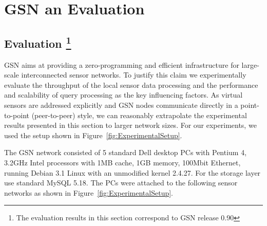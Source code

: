 \graphicspath{{chapters/ch-gsn/figures/}}

\chapter{GSN an Evaluation}%



\section{Evaluation \footnote{The evaluation results in this section correspond to GSN release 0.90}}
\label{sec:evaluation}

GSN aims at providing a zero-programming and efficient infrastructure for
large-scale interconnected sensor networks. To justify this claim we
experimentally evaluate the throughput of the local sensor data processing and
the performance and scalability of query processing as the key influencing
factors.  As virtual sensors are addressed explicitly and GSN nodes communicate
directly in a point-to-point (peer-to-peer) style, we can reasonably
extrapolate the experimental results presented in this section to larger
network sizes.  For our experiments, we used the setup shown in
Figure~\ref{fig:ExperimentalSetup}.

The GSN network consisted of 5 standard Dell desktop PCs with Pentium 4, 3.2GHz
Intel processors with 1MB cache, 1GB memory, 100Mbit Ethernet, running Debian
3.1 Linux with an unmodified kernel 2.4.27. For the storage layer use standard
MySQL 5.18.  The PCs were attached to the following sensor networks as shown in
Figure~\ref{fig:ExperimentalSetup}.

